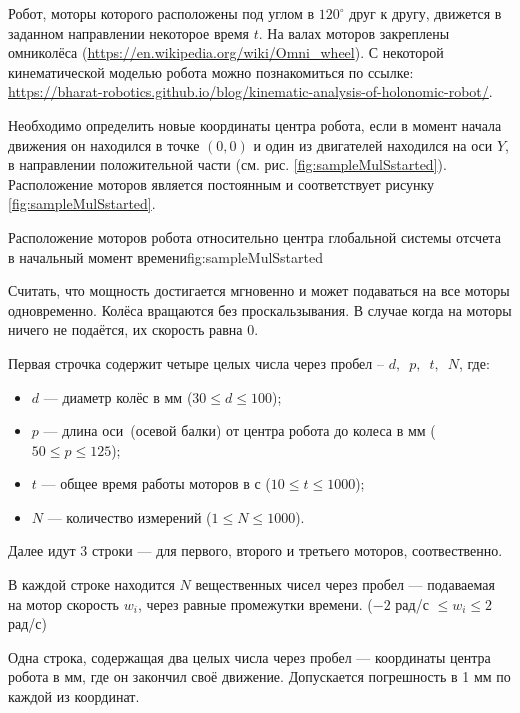
Робот, моторы которого расположены под углом в $120^{\circ}$ друг к другу,
движется в заданном направлении некоторое время $t$.
На валах моторов закреплены омниколёса (\url{https://en.wikipedia.org/wiki/Omni_wheel}).
С некоторой кинематической моделью робота можно познакомиться по ссылке:
\url{https://bharat-robotics.github.io/blog/kinematic-analysis-of-holonomic-robot/}.


Необходимо определить новые координаты центра робота,  если в момент начала движения он находился в точке
$(0,0)$ и один из двигателей находился на оси $Y$, в направлении положительной части (см. рис. \ref{fig:sampleMulSstarted}).
Расположение моторов является постоянным и соответствует рисунку \ref{fig:sampleMulSstarted}.


{Расположение моторов робота относительно центра глобальной системы отсчета в начальный момент времени}{fig:sampleMulSstarted}

Считать, что мощность достигается мгновенно и может подаваться на все моторы одновременно.
Колёса вращаются без проскальзывания.
В случае когда на моторы ничего не подаётся, их скорость равна $0$.


Первая строчка содержит четыре целых числа через пробел -- $d,$~$p,$~$t,$~$N$, где:

\begin{itemize}
    \item $d$ --- диаметр колёс в мм ($30 \leq d \leq 100$);
    \item $p$ --- длина оси~(осевой балки) от центра робота до колеса в мм ($ 50 \leq p \leq 125$);
    \item $t$ --- общее время работы моторов в с ($10 \leq t \leq 1000$);
    \item $N$ --- количество измерений ($1 \leq N \leq 1000$).
\end{itemize}


Далее идут $3$ строки --- для первого, второго и третьего моторов, соотвественно.

В каждой строке находится $N$ вещественных чисел через пробел ---  подаваемая на мотор скорость $w_i$, через равные промежутки
времени. ($-2$ рад/с $\leq w_i \leq 2$ рад/с)


\outputfmtSection

Одна строка, содержащая два целых числа  через пробел  --- координаты центра робота в мм,
где он закончил своё движение.
Допускается погрешность в 1 мм по каждой из координат.



